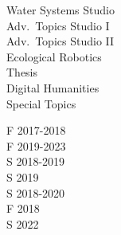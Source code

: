\documentclass[10pt]{developercv} %
\begin{document}
\begin{minipage}[t]{0.25\textwidth} 
Water Systems Studio\\
Adv.~Topics Studio I\\
Adv.~Topics Studio II\\
Ecological Robotics\\
Thesis\\
Digital Humanities\\
Special Topics\\
\end{minipage}
\begin{minipage}[t]{0.15\textwidth} 
F 2017-2018\\
F 2019-2023\\
S 2018-2019\\
S 2019\\
S 2018-2020\\
F 2018\\
S 2022\\
\end{minipage}






\end{document}
